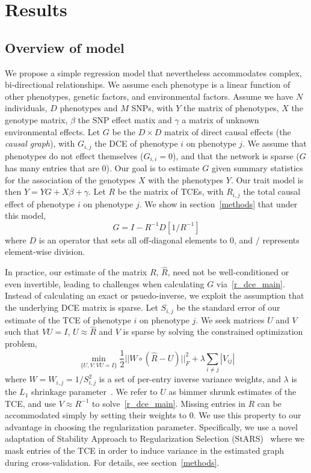 \documentclass{article}
\begin{document}
\section{Results}
\subsection*{Overview of model}
We propose a simple regression model that nevertheless accommodates complex, bi-directional relationships.
We assume each phenotype is a linear function
of other phenotypes, genetic factors, and environmental factors.
Assume we have $N$ individuals, $D$ phenotypes and $M$ SNPs,
with $Y$ the matrix of phenotypes, $X$ the genotype
matrix, $\beta$ the SNP effect matix and $\gamma$ a matrix of unknown
environmental effects. Let $G$ be the $D \times D$ matrix of
direct causal effects (the \emph{causal graph}), with $G_{i, j}$ the DCE of phenotype $i$ on
phenotype $j$. We assume that phenotypes do not effect themselves ($G_{i,i} = 0$),
and that the network is sparse ($G$ has many entries that are $0$).
Our goal is to estimate $G$ given summary statistics
 for the association of the genotypes $X$ with the phenotypes $Y$.
 Our trait model is then $Y = Y G + X\beta + \gamma$.
Let $R$ be the matrix of TCEs, with $R_{i,j}$ the total
causal effect of phenotype $i$ on phenotype $j$.
We show in section~\ref{methods} that under this model,
\begin{equation}\label{r_dce_main}
G = I - R^{-1} D[1 / R^{-1}]
\end{equation}
where $D$ is an operator that sets all off-diagonal elements to 0, and $/$
represents element-wise division.

In practice, our estimate of the matrix $R$, $\hat{R}$, need not be well-conditioned or
 even invertible, leading
to challenges when calculating $G$ via~\eqref{r_dce_main}. Instead of calculating an exact
or psuedo-inverse, we exploit the assumption that the underlying
DCE matrix is sparse. Let $S_{i,j}$ be the standard error of our estimate of
the TCE of phenotype $i$ on phenotype $j$. We seek matrices $U$ and $V$ such that $VU=I$, $U \approx \hat{R}$
and $V$ is sparse by solving the constrained optimization problem,
\begin{equation} \label{opt_main}
\min_{\{U, V : VU = I\}} \frac{1}{2} ||W \circ \left(\hat{R} - U\right)||_F^2 +
   \lambda \sum_{i\neq j}|V_{ij}|
\end{equation}
where $W = W_{i,j} = 1/S_{i,j}^2$ is a set of per-entry inverse variance weights,
and $\lambda$ is the $L_1$ shrinkage parameter~\cite{Friedman2007,Tishbirani1996}.
We refer to $U$ as bimmer shrunk estimates of the TCE, and
use $V \approx R^{-1}$ to solve~\eqref{r_dce_main}.
Missing entries in $R$ can be accommodated simply
by setting their weights to 0. We use this property to our advantage in choosing the
regularization parameter. Specifically, we use a novel adaptation of Stability Approach
to Regularization Selection (StARS)~\cite{Liu2010} where we mask entries of the TCE
in order to induce variance in the estimated graph during cross-validation.
For details, see section~\ref{methods}.
\end{document}
